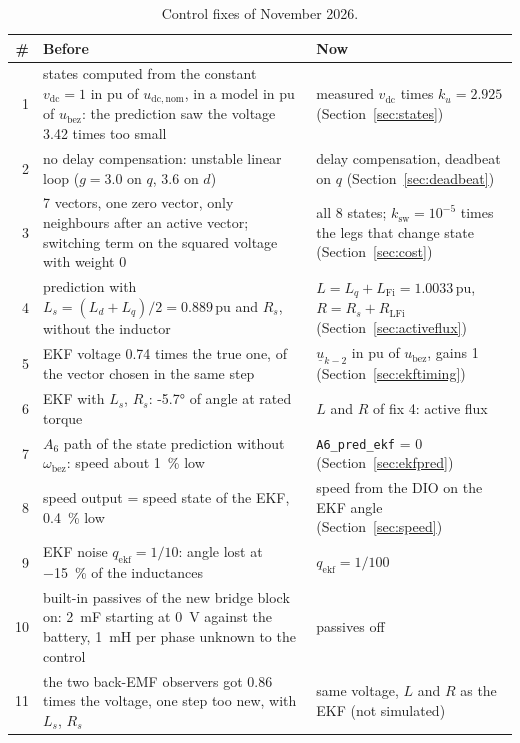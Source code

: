 \documentclass[11pt,a4paper]{scrartcl}
\newcommand{\ped}[1]{_{\mathrm{#1}}}
\newcommand{\code}[1]{\texttt{#1}}
\newcommand{\pun}{\,\mathrm{pu}}
\begin{document}
\begin{onehalfspace}
\begin{table}[H]
	\centering
	\footnotesize
	\caption{Control fixes of November 2026.}
	\label{tab:fixes}
	\begin{tabularx}{\textwidth}{@{} r X X @{}}
		\toprule
		\textbf{\#} & \textbf{Before} & \textbf{Now} \\
		\midrule
		1 & states computed from the constant $v\ped{dc} = 1$ in pu of $u\ped{dc,nom}$, in a model in pu of $u\ped{bez}$: the prediction saw the voltage 3.42 times too small & measured $v\ped{dc}$ times $k_u = 2.925$ (Section~\ref{sec:states}) \\
		2 & no delay compensation: unstable linear loop ($g = 3.0$ on $q$, 3.6 on $d$) & delay compensation, deadbeat on $q$ (Section~\ref{sec:deadbeat}) \\
		3 & 7 vectors, one zero vector, only neighbours after an active vector; switching term on the squared voltage with weight 0 & all 8 states; $k\ped{sw} = 10^{-5}$ times the legs that change state (Section~\ref{sec:cost}) \\
		4 & prediction with $L_s = (L_d + L_q)/2 = 0.889\pun$ and $R_s$, without the inductor & $L = L_q + L\ped{Fi} = 1.0033\pun$, $R = R_s + R\ped{LFi}$ (Section~\ref{sec:activeflux}) \\
		5 & EKF voltage 0.74 times the true one, of the vector chosen in the same step & $\underline{u}_{k-2}$ in pu of $u\ped{bez}$, gains 1 (Section~\ref{sec:ekftiming}) \\
		6 & EKF with $L_s$, $R_s$: \ang{-5.7} of angle at rated torque & $L$ and $R$ of fix 4: active flux \\
		7 & $A_6$ path of the state prediction without $\omega\ped{bez}$: speed about \SI{1}{\percent} low & \code{A6\_pred\_ekf} = 0 (Section~\ref{sec:ekfpred}) \\
		8 & speed output = speed state of the EKF, \SI{0.4}{\percent} low & speed from the DIO on the EKF angle (Section~\ref{sec:speed}) \\
		9 & EKF noise $q\ped{ekf} = 1/10$: angle lost at \SI{-15}{\percent} of the inductances & $q\ped{ekf} = 1/100$ \\
		10 & built-in passives of the new bridge block on: \SI{2}{\milli\farad} starting at \SI{0}{\volt} against the battery, \SI{1}{\milli\henry} per phase unknown to the control & passives off \\
		11 & the two back-EMF observers got 0.86 times the voltage, one step too new, with $L_s$, $R_s$ & same voltage, $L$ and $R$ as the EKF (not simulated) \\
		\bottomrule
	\end{tabularx}
\end{table}


\end{onehalfspace}
\end{document}
